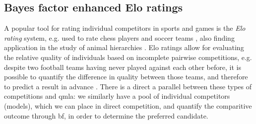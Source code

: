 \subsection{Bayes factor enhanced Elo ratings}\label{sec:elo}
A popular tool for rating individual competitors in sports and games is the \emph{\gls{Elo rating}} system, 
    e.g. used to rate chess players and soccer teams \cite{elo1978rating, fifa_elo}, 
    also finding application in the study of animal hierarchies \cite{neumann2011assessing}. 
\glspl{Elo rating} allow for evaluating the relative quality of individuals 
    based on incomplete pairwise competitions, 
    e.g. despite two football teams having never played against each other before, 
    it is possible to quantify the difference in quality between those teams, 
    and therefore to predict a result in advance \cite{hvattum2010using}. 
There is a direct a parallel between these types of competitions and \gls{qmla}:
    we similarly have a pool of individual competitors (models), 
    which we can place in direct competition, 
    and quantify the comparitive outcome through \gls{bf}, 
    in order to determine the preferred candidate. 

